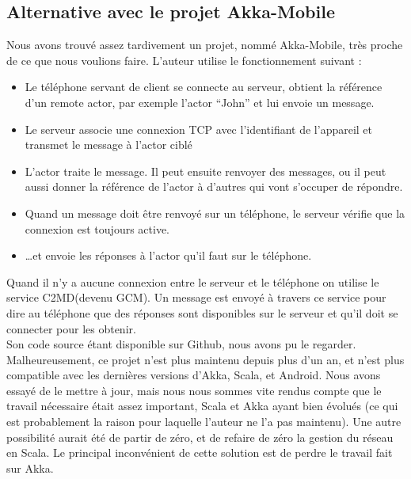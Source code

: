 \documentclass[a4paper,12pt]{article}
\begin{document}
\subsection{Alternative avec le projet Akka-Mobile}
Nous avons trouvé assez tardivement un projet, nommé Akka-Mobile, très proche
de ce que nous voulions faire. L’auteur utilise le fonctionnement suivant :\\
\begin{itemize}
\item Le téléphone servant de client se connecte au serveur, obtient la
  référence d’un remote actor, par exemple l’actor “John” et lui envoie un
  message.\\
\item Le serveur associe une connexion TCP avec l’identifiant de l’appareil et
  transmet le message à l’actor ciblé\\
\item L’actor traite le message. Il peut ensuite renvoyer des messages, ou il
  peut aussi donner la référence de l’actor à d’autres qui vont s’occuper de
  répondre.\\
\item Quand un message doit être renvoyé sur un téléphone, le serveur vérifie
  que la connexion est toujours active.\\
\item …et envoie les réponses à l’actor qu’il faut sur le téléphone.
\end{itemize}
Quand il n’y a aucune connexion entre le serveur et le téléphone on utilise le
service C2MD(devenu GCM). Un message est envoyé à travers ce service pour dire
au téléphone que des réponses sont disponibles sur le serveur et qu’il doit se
connecter pour les obtenir.\\

Son code source étant disponible sur Github, nous avons pu le
regarder. Malheureusement, ce projet n’est plus maintenu depuis plus d’un an,
et n’est plus compatible avec les dernières versions d’Akka, Scala, et
Android. Nous avons essayé de le mettre à jour, mais nous nous sommes vite
rendus compte que le travail nécessaire était assez important, Scala et Akka
ayant bien évolués (ce qui est probablement la raison pour laquelle l’auteur ne
l’a pas maintenu).  Une autre possibilité aurait été de partir de zéro, et de
refaire de zéro la gestion du réseau en Scala. Le principal inconvénient de
cette solution est de perdre le travail fait sur Akka.

\newpage
\end{document}
